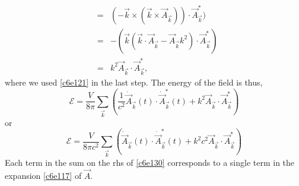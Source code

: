 \begin{enumerate}
\begin{eqnarray*}
&=& (-\vec{k}\times(\vec{k}\times\vec{A}_{\vec{k}}))\cdot\vec{A}_{\vec{k}}^\ast) \\
&=& -(\vec{k}(\vec{k}\cdot\vec{A}_{\vec{k}} - \vec{A}_{\vec{k}}k^2)\cdot\vec{A}_{\vec{k}}^\ast) \\
&=& k^2\vec{A}_{\vec{k}}\cdot\vec{A}_{\vec{k}}^\ast,
\end{eqnarray*}
where we used \eqref{c6e121} in the last step. The energy of the field is thus,
\[
\mathcal{E} = \frac{V}{8\pi}\sum_{\vec{k}}
\left(\frac{1}{c^2}\dot{\vec{A}}_{\vec{k}}(t)\cdot\dot{\vec{A}}_{\vec{k}}^\ast(t) +
k^2\vec{A}_{\vec{k}}\cdot\vec{A}_{\vec{k}}^\ast\right)
\]
or
\begin{equation}\label{c6e130}
\mathcal{E} = \frac{V}{8\pi c^2}\sum_{\vec{k}}
\left(\dot{\vec{A}}_{\vec{k}}(t)\cdot\dot{\vec{A}}_{\vec{k}}^\ast(t) +
k^2c^2\vec{A}_{\vec{k}}\cdot\vec{A}_{\vec{k}}^\ast\right)
\end{equation}
Each term in the sum on the rhs of \eqref{c6e130} corresponds to a single term in
the expansion \eqref{c6e117} of $\vec{A}$.


\end{enumerate}
